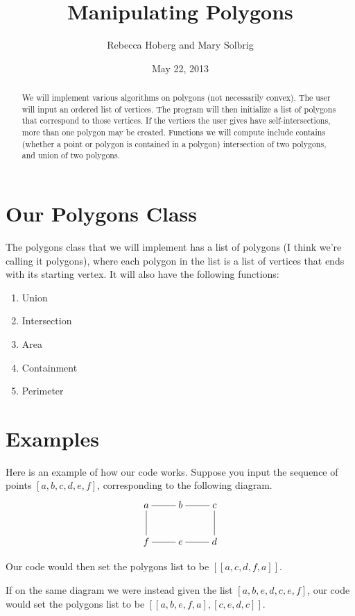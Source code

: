 \documentclass[psamsfonts]{amsart}
\title{Manipulating Polygons}
\author{Rebecca Hoberg and Mary Solbrig}
\date{May 22, 2013}
\theoremstyle{definition}
\theoremstyle{remark}
\numberwithin{equation}{section}
\begin{document}
\begin{abstract}

We will implement various algorithms on polygons (not necessarily convex).
The user will input an ordered list of vertices. The program will then initialize a list of polygons that correspond to those vertices.
If the vertices the user gives have self-intersections, more than one polygon may be created.
Functions we will compute include contains (whether a point or polygon is contained in a polygon) intersection of two polygons, and union of two polygons.

\end{abstract}

\maketitle

\tableofcontents

\section{Our Polygons Class}
The polygons class that we will implement has a list of polygons (I think we're calling it polygons), where each polygon in the list is a list of vertices that ends with its starting vertex.
It will also have the following functions:
\begin{enumerate}
\item{Union }
\item{Intersection}
\item{Area}
\item{Containment}
\item{Perimeter}
\end{enumerate}
\section{Examples}

Here is an example of how our code works. Suppose you input the sequence of points $[a,b,c,d,e,f]$, corresponding to the following diagram.
\[\xymatrix{
a \ar@{-}[r]  \ar@{-}[d]  & b \ar @{-}[r] & c \ar@{-}[d] \\
f \ar@{-}[r] & e\ar@{-}[r] & d\\} \]

Our code would then set the polygons list to be $[[a,c,d,f,a]]$.

If on the same diagram we were instead given the list $[a,b,e,d,c,e,f]$, our code would set the polygons list to be 
$[[a,b,e,f,a], [c,e,d,c]]. $
\end{document}
